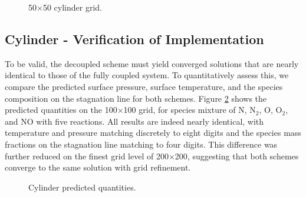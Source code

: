 \begin{figure}[h]
	\centering
	\caption{50$\times$50 cylinder grid.}
  \label{grid}
\end{figure}

\subsection{Cylinder - Verification of Implementation}

To be valid, the decoupled scheme must yield converged solutions that
are nearly identical to those of the fully coupled system. To quantitatively
assess this, we compare the predicted surface pressure, surface temperature, and
the species composition on the stagnation line for both schemes.  Figure
\ref{pq} shows the predicted quantities on the 100$\times$100 grid, for species
mixture of N, $\text{N}_2$, O, $\text{O}_2$, and NO with five reactions. All
results are indeed nearly identical, with temperature and pressure matching
discretely to eight digits and the species mass fractions on the stagnation line
matching to four digits.  This difference was further reduced on the finest grid
level of 200$\times$200, suggesting that both schemes converge to the same
solution with grid refinement.
\begin{figure}[h!]
  \captionsetup[subfigure]{position=b}
  \centering
	\caption{Cylinder predicted quantities.}
	\label{pq}
\end{figure}

